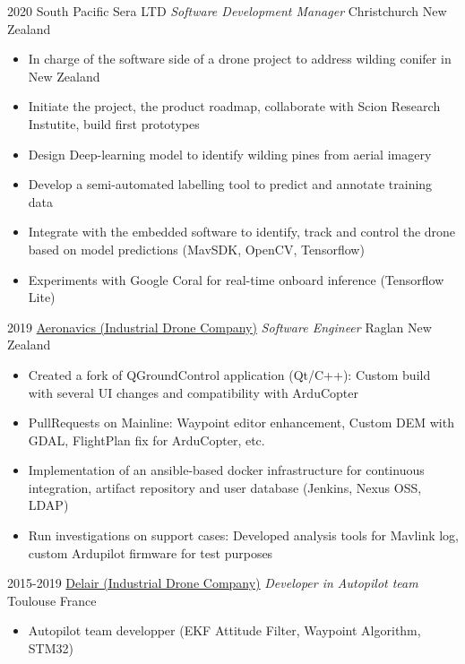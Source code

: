 \documentclass[a4paper]{friggeri-cv} %
\begin{document}
\begin{entrylist}
\entry
{2020}
{South Pacific Sera LTD \textit{ Software Development Manager}}
{Christchurch New Zealand}
{
\begin{itemize}
    \item In charge of the software side of a drone project to address wilding conifer in New Zealand
    \item Initiate the project, the product roadmap, collaborate with Scion Research Instutite, build first prototypes
    \item Design Deep-learning model to identify wilding pines from aerial imagery
    \item Develop a semi-automated labelling tool to predict and annotate training data
    \item Integrate with the embedded software to identify, track and control the drone based on model predictions (MavSDK, OpenCV, Tensorflow)
    \item Experiments with Google Coral for real-time onboard inference (Tensorflow Lite)
\end{itemize}
%
}
\entry
{2019}
{\href{https://aeronavics.com}{Aeronavics (Industrial Drone Company)} \textit{ Software Engineer}}
{Raglan New Zealand}
{
\begin{itemize}
    \item Created a fork of QGroundControl application (Qt/C++): Custom build with several UI changes and compatibility with ArduCopter
    \item PullRequests on Mainline: Waypoint editor enhancement, Custom DEM with GDAL, FlightPlan fix for ArduCopter, etc.  
    \item Implementation of an ansible-based docker infrastructure for continuous integration, artifact repository and user database (Jenkins, Nexus OSS, LDAP)
    \item Run investigations on support cases: Developed analysis tools for Mavlink log, custom Ardupilot firmware for test purposes
\end{itemize}
%
}
\entry
{2015-2019}
{\href{https://delair.aero}{Delair (Industrial Drone Company)} \textit{ Developer in Autopilot team}}
{Toulouse France}
{
\begin{itemize}
\item Autopilot team developper (EKF Attitude Filter, Waypoint Algorithm, STM32) 

\end{itemize}}
\end{entrylist}
\end{document}
